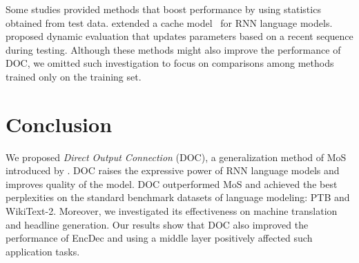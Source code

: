 \documentclass[11pt,a4paper]{article}
\begin{document}
Some studies provided methods that boost performance by using statistics obtained from test data.
 extended a cache model~\cite{cache4ngram} for RNN language models.
 proposed dynamic evaluation that updates parameters based on a recent sequence during testing.
Although these methods might also improve the performance of DOC, we omitted such investigation to focus on comparisons among methods trained only on the training set.


\section{Conclusion}
We proposed \textit{Direct Output Connection} (DOC), a generalization method of MoS introduced by .
DOC raises the expressive power of RNN language models and improves quality of the model.
DOC outperformed MoS and achieved the best perplexities on the standard benchmark datasets of language modeling: PTB and WikiText-2.
Moreover, we investigated its effectiveness on machine translation and headline generation.
Our results show that DOC also improved the performance of EncDec and using a middle layer positively affected such application tasks.







\end{document}
